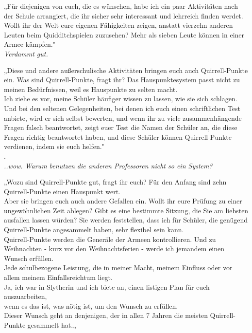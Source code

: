 {„Für diejenigen von euch, die es wünschen, habe ich ein paar Aktivitäten nach der Schule arrangiert, die ihr sicher sehr interessant und lehrreich finden werdet.\\ Wollt ihr der Welt eure eigenen Fähigkeiten zeigen, anstatt vierzehn anderen Leuten beim Quidditchspielen zuzusehen? Mehr als sieben Leute können in einer Armee kämpfen."\\ \emph{\hfill\break Verdammt gut.}

„Diese und andere außerschulische Aktivitäten bringen euch auch Quirrell-Punkte ein. Was sind Quirrell-Punkte, fragt ihr? Das Hauspunktesystem passt nicht zu meinen Bedürfnissen, weil es Hauspunkte zu selten macht.\\ Ich ziehe es vor, meine Schüler häufiger wissen zu lassen, wie sie sich schlagen. Und bei den seltenen Gelegenheiten, bei denen ich euch einen schriftlichen Test anbiete, wird er sich selbst bewerten, und wenn ihr zu viele zusammenhängende Fragen falsch beantwortet, zeigt euer Test die Namen der Schüler an, die diese Fragen richtig beantwortet haben, und diese Schüler können Quirrell-Punkte verdienen, indem sie euch helfen."\\ .\\ \emph{..wow. Warum benutzen die anderen Professoren nicht so ein System?}

„Wozu sind Quirrell-Punkte gut, fragt ihr euch? Für den Anfang sind zehn Quirrell-Punkte einen Hauspunkt wert.\\ Aber sie bringen euch auch andere Gefallen ein. Wollt ihr eure Prüfung zu einer ungewöhnlichen Zeit ablegen? Gibt es eine bestimmte Sitzung, die Sie am liebsten ausfallen lassen würden? Sie werden feststellen, dass ich für Schüler, die genügend Quirrell-Punkte angesammelt haben, sehr flexibel sein kann.\\ Quirrell-Punkte werden die Generäle der Armeen kontrollieren. Und zu Weihnachten - kurz vor den Weihnachtsferien - werde ich jemandem einen Wunsch erfüllen.\\ Jede schulbezogene Leistung, die in meiner Macht, meinem Einfluss oder vor allem meinem Einfallsreichtum liegt.\\ Ja, ich war in Slytherin und ich biete an, einen listigen Plan für euch auszuarbeiten,\\ wenn es das ist, was nötig ist, um den Wunsch zu erfüllen.\\ Dieser Wunsch geht an denjenigen, der in allen 7 Jahren die meisten Quirrell-Punkte gesammelt hat.„

}
